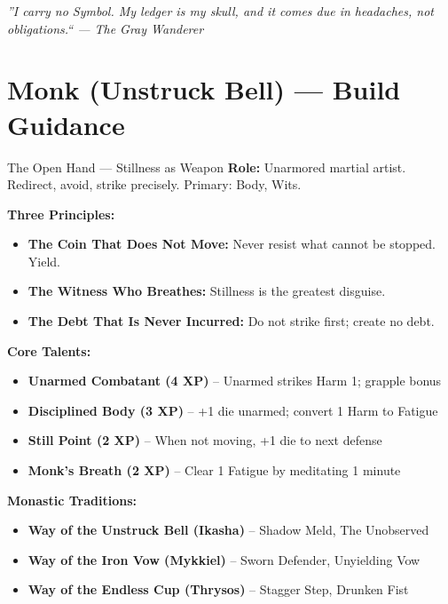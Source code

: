 \documentclass[10pt]{article}
\begin{document}
\vspace{0.5em}
\begin{center}
    {\small\sffamily\itshape ''I carry no Symbol. My ledger is my skull, and it comes due in headaches, not obligations.`` --- The Gray Wanderer}
\end{center}

\newpage


\section*{Monk (Unstruck Bell) --- Build Guidance}

\begin{tipbox}{The Open Hand --- Stillness as Weapon}
    \textbf{Role:} Unarmored martial artist. Redirect, avoid, strike precisely. Primary: Body, Wits.
    
    \textbf{Three Principles:}
    \begin{itemize}
        \item \textbf{The Coin That Does Not Move:} Never resist what cannot be stopped. Yield.
        \item \textbf{The Witness Who Breathes:} Stillness is the greatest disguise.
        \item \textbf{The Debt That Is Never Incurred:} Do not strike first; create no debt.
    \end{itemize}
    
    \textbf{Core Talents:}
    \begin{itemize}
        \item \textbf{Unarmed Combatant (4 XP)} -- Unarmed strikes Harm 1; grapple bonus
        \item \textbf{Disciplined Body (3 XP)} -- +1 die unarmed; convert 1 Harm to Fatigue
        \item \textbf{Still Point (2 XP)} -- When not moving, +1 die to next defense
        \item \textbf{Monk's Breath (2 XP)} -- Clear 1 Fatigue by meditating 1 minute
    \end{itemize}
    
    \textbf{Monastic Traditions:}
    \begin{itemize}
        \item \textbf{Way of the Unstruck Bell (Ikasha)} -- Shadow Meld, The Unobserved
        \item \textbf{Way of the Iron Vow (Mykkiel)} -- Sworn Defender, Unyielding Vow
        \item \textbf{Way of the Endless Cup (Thrysos)} -- Stagger Step, Drunken Fist
    \end{itemize}
\end{tipbox}
\end{document}
